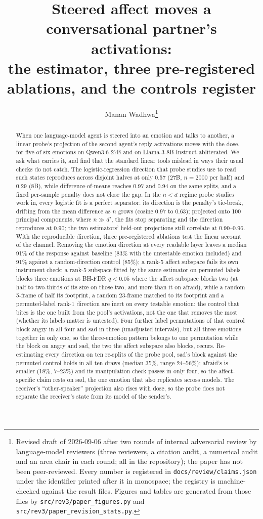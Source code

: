 \documentclass[11pt]{article}
\title{Steered affect moves a conversational partner's activations:\\ the estimator, three pre-registered ablations, and the controls register}
\author{Manan Wadhwa\thanks{Revised draft of 2026-09-06 after two rounds of internal adversarial review by language-model reviewers (three reviewers, a citation audit, a numerical audit and an area chair in each round; all in the repository); the paper has not been peer-reviewed. Every number is registered in \texttt{docs/review/claims.json} under the identifier printed after it in monospace; the registry is machine-checked against the result files. Figures and tables are generated from those files by \texttt{src/rev3/paper\_figures.py} and \texttt{src/rev3/paper\_revision\_stats.py}.}}
\date{}
\begin{document}
\maketitle

\begin{abstract}
When one language-model agent is steered into an emotion and talks to another, a linear probe's projection of the second agent's reply activations moves with the dose, for five of six emotions on Qwen3.6-27B and on Llama-3-8B-Instruct-abliterated. We ask what carries it, and find that the standard linear tools mislead in ways their usual checks do not catch. The logistic-regression direction that probe studies use to read such states reproduces across disjoint halves at only 0.57 (27B, $n=2000$ per half) and 0.29 (8B), while difference-of-means reaches 0.97 and 0.94 on the same splits, and a fixed per-sample penalty does not close the gap. In the $n<d$ regime probe studies work in, every logistic fit is a perfect separator: its direction is the penalty's tie-break, drifting from the mean difference as $n$ grows (cosine 0.97 to 0.63); projected onto 100 principal components, where $n \gg d'$, the fits stop separating and the direction reproduces at 0.90; the two estimators' held-out projections still correlate at 0.90--0.96. With the reproducible direction, three pre-registered ablations test the linear account of the channel. Removing the emotion direction at every readable layer leaves a median 91\% of the response against baseline (83\% with the untestable emotion included) and 91\% against a random-direction control (85\%); a rank-5 affect subspace fails its own instrument check; a rank-5 subspace fitted by the same estimator on permuted labels blocks three emotions at BH-FDR $q<0.05$ where the affect subspace blocks two (at half to two-thirds of its size on those two, and more than it on afraid), while a random 5-frame of half its footprint, a random 23-frame matched to its footprint and a permuted-label rank-1 direction are inert on every testable emotion: the control that bites is the one built from the pool's activations, not the one that removes the most (whether its labels matter is untested). Four further label permutations of that control block angry in all four and sad in three (unadjusted intervals), but all three emotions together in only one, so the three-emotion pattern belongs to one permutation while the block on angry and sad, the two the affect subspace also blocks, recurs. Re-estimating every direction on ten re-splits of the probe pool, sad's block against the permuted control holds in all ten draws (median 35\%, range 24--56\%); afraid's is smaller (18\%, 7--23\%) and its manipulation check passes in only four, so the affect-specific claim rests on sad, the one emotion that also replicates across models. The receiver's ``other-speaker'' projection also rises with dose, so the probe does not separate the receiver's state from its model of the sender's.
\end{abstract}
\end{document}
